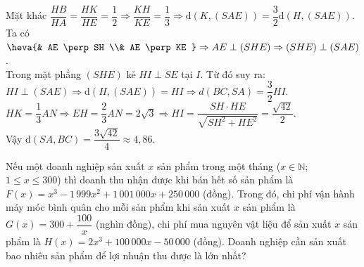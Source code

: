 \begin{ex}
{	Mặt khác $\dfrac{HB}{HA} = \dfrac{HK}{HE} = \dfrac{1}{2} \Rightarrow \dfrac{KH}{KE} = \dfrac{1}{3} \Rightarrow \mathrm{d}\left( K, \left( SAE \right) \right) = \dfrac{3}{2} \mathrm{d}\left( H, \left( SAE \right) \right)$.\\
	Ta có $\heva{& AE \perp SH \\& AE \perp KE } \Rightarrow AE \perp \left( SHE \right) \Rightarrow \left( SHE \right) \perp \left( SAE \right)$.\\
	Trong mặt phẳng $\left( SHE \right)$ kẻ $HI \perp SE$ tại $I$. Từ đó suy ra:\\
	$HI \perp \left( SAE \right) \Rightarrow \mathrm{d}\left( H, \left( SAE \right) \right) = HI \Rightarrow d\left( BC, SA \right) = \dfrac{3}{2} HI$.\\
	$HK = \dfrac{1}{3} AN \Rightarrow EH = \dfrac{2}{3} AN = 2\sqrt{3} \Rightarrow HI = \dfrac{SH \cdot HE}{\sqrt{S H^{2} + H E^{2}}} = \dfrac{\sqrt{42}}{2}$.\\
	Vậy $\mathrm{d}\left( SA, BC \right) = \dfrac{3\sqrt{42}}{4} \approx 4{,}86$.
	}
\end{ex}
\begin{ex}%
	Nếu một doanh nghiệp sản xuất $x$ sản phẩm trong một tháng ($x \in \mathbb{N}$; $1 \le x \le 300$) thì doanh thu nhận được khi bán hết số sản phẩm là $F(x) = x^3 - 1\,999x^2 + 1\,001\,000x + 250\,000$ (đồng). Trong đó, chi phí vận hành máy móc bình quân cho mỗi sản phẩm khi sản xuất $x$ sản phẩm là $G(x) = 300 + \dfrac{100}{x}$ (nghìn đồng), chi phí mua nguyên vật liệu để sản xuất $x$ sản phẩm là $H(x) = 2x^3 + 100\,000x - 50\,000$ (đồng). Doanh nghiệp cần sản xuất bao nhiêu sản phẩm để lợi nhuận thu được là lớn nhất?
\end{ex}
